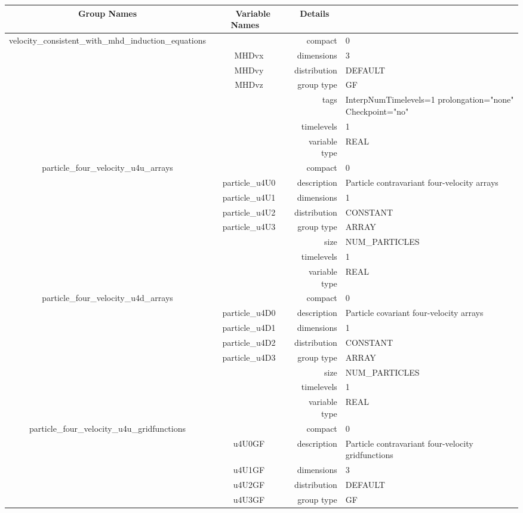 \begin{tabular*}{150mm}{|c|c@{\extracolsep{\fill}}|rl|} \hline 
~ {\bf Group Names} ~ & ~ {\bf Variable Names} ~  &{\bf Details} ~ & ~ \\ 
\hline 
velocity\_consistent\_with\_mhd\_induction\_equations &  & compact & 0 \\ 
 & MHDvx & dimensions & 3 \\ 
 & MHDvy & distribution & DEFAULT \\ 
 & MHDvz & group type & GF \\ 
 &  & tags & InterpNumTimelevels=1 prolongation="none" Checkpoint="no" \\ 
 &  & timelevels & 1 \\ 
 &  & variable type & REAL \\ 
\hline 
particle\_four\_velocity\_u4u\_arrays &  & compact & 0 \\ 
 & particle\_u4U0 & description & Particle contravariant four-velocity arrays \\ 
 & particle\_u4U1 & dimensions & 1 \\ 
 & particle\_u4U2 & distribution & CONSTANT \\ 
 & particle\_u4U3 & group type & ARRAY \\ 
 &  & size & NUM\_PARTICLES \\ 
 &  & timelevels & 1 \\ 
 &  & variable type & REAL \\ 
\hline 
particle\_four\_velocity\_u4d\_arrays &  & compact & 0 \\ 
 & particle\_u4D0 & description & Particle covariant four-velocity arrays \\ 
 & particle\_u4D1 & dimensions & 1 \\ 
 & particle\_u4D2 & distribution & CONSTANT \\ 
 & particle\_u4D3 & group type & ARRAY \\ 
 &  & size & NUM\_PARTICLES \\ 
 &  & timelevels & 1 \\ 
 &  & variable type & REAL \\ 
\hline 
particle\_four\_velocity\_u4u\_gridfunctions &  & compact & 0 \\ 
 & u4U0GF & description & Particle contravariant four-velocity gridfunctions \\ 
 & u4U1GF & dimensions & 3 \\ 
 & u4U2GF & distribution & DEFAULT \\ 
 & u4U3GF & group type & GF \\ 

\end{tabular*}
